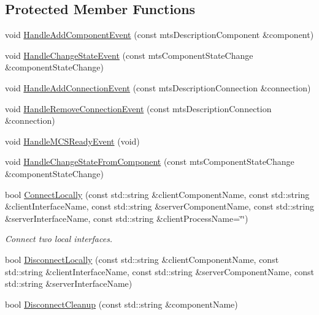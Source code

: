 \subsection*{Protected Member Functions}
\begin{DoxyCompactItemize}
\item 
void \hyperlink{classmts_manager_component_client_a74e843a393f86d5833e4ce3512d761b2}{Handle\+Add\+Component\+Event} (const mts\+Description\+Component \&component)
\item 
void \hyperlink{classmts_manager_component_client_a17e48a1d9081a4d62f293787ac37c5b4}{Handle\+Change\+State\+Event} (const mts\+Component\+State\+Change \&component\+State\+Change)
\item 
void \hyperlink{classmts_manager_component_client_a490ba873a6c3779591f92481c5470af3}{Handle\+Add\+Connection\+Event} (const mts\+Description\+Connection \&connection)
\item 
void \hyperlink{classmts_manager_component_client_afa0aeaa9dbd504c937c7ca945733ee66}{Handle\+Remove\+Connection\+Event} (const mts\+Description\+Connection \&connection)
\item 
void \hyperlink{classmts_manager_component_client_ad271d0982a619c54ae9a2c92bed9b200}{Handle\+M\+C\+S\+Ready\+Event} (void)
\item 
void \hyperlink{classmts_manager_component_client_a63ecbac11f325540b97148984ab9ac54}{Handle\+Change\+State\+From\+Component} (const mts\+Component\+State\+Change \&component\+State\+Change)
\item 
bool \hyperlink{classmts_manager_component_client_a0dc5f4b41be4b09a845f1c866a6f9ef4}{Connect\+Locally} (const std\+::string \&client\+Component\+Name, const std\+::string \&client\+Interface\+Name, const std\+::string \&server\+Component\+Name, const std\+::string \&server\+Interface\+Name, const std\+::string \&client\+Process\+Name=\char`\"{}\char`\"{})
\begin{DoxyCompactList}\small\item\em Connect two local interfaces. \end{DoxyCompactList}\item 
bool \hyperlink{classmts_manager_component_client_a8f66d717b2e966b375ac848e6661a459}{Disconnect\+Locally} (const std\+::string \&client\+Component\+Name, const std\+::string \&client\+Interface\+Name, const std\+::string \&server\+Component\+Name, const std\+::string \&server\+Interface\+Name)
\item 
bool \hyperlink{classmts_manager_component_client_a247fc2e5e3114a0968b81294d0e07efb}{Disconnect\+Cleanup} (const std\+::string \&component\+Name)

\end{DoxyCompactItemize}
